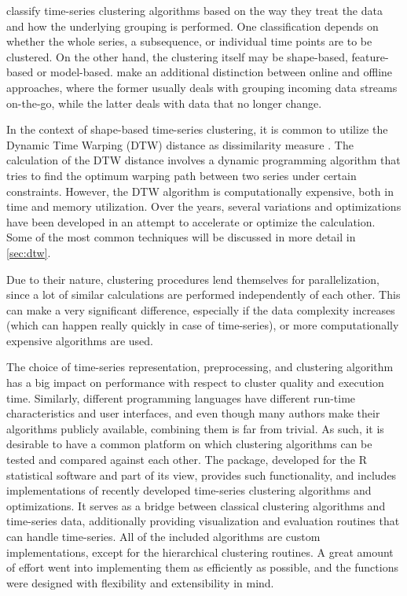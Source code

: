 \citet{aghabozorgi2015} classify time-series clustering algorithms based on the way they treat the data and how the underlying grouping is performed.
One classification depends on whether the whole series,
a subsequence,
or individual time points are to be clustered.
On the other hand,
the clustering itself may be shape-based,
feature-based
or model-based.
\citet{aggarwal2013} make an additional distinction between online and offline approaches,
where the former usually deals with grouping incoming data streams on-the-go,
while the latter deals with data that no longer change.

In the context of shape-based time-series clustering,
it is common to utilize the Dynamic Time Warping (DTW) distance as dissimilarity measure \citep{aghabozorgi2015}.
The calculation of the DTW distance involves a dynamic programming algorithm that tries to find the optimum warping path between two series under certain constraints.
However, the DTW algorithm is computationally expensive,
both in time and memory utilization.
Over the years, several variations and optimizations have been developed in an attempt to accelerate or optimize the calculation.
Some of the most common techniques will be discussed in more detail in \cref{sec:dtw}.

Due to their nature,
clustering procedures lend themselves for parallelization,
since a lot of similar calculations are performed independently of each other.
This can make a very significant difference,
especially if the data complexity increases
(which can happen really quickly in case of time-series),
or more computationally expensive algorithms are used.

The choice of time-series representation,
preprocessing,
and clustering algorithm has a big impact on performance with respect to cluster quality and execution time.
Similarly, different programming languages have different run-time characteristics and user interfaces,
and even though many authors make their algorithms publicly available,
combining them is far from trivial.
As such,
it is desirable to have a common platform on which clustering algorithms can be tested and compared against each other.
The \dtwclust{} package,
developed for the R statistical software and part of its  view,
provides such functionality,
and includes implementations of recently developed time-series clustering algorithms and optimizations.
It serves as a bridge between classical clustering algorithms and time-series data,
additionally providing visualization and evaluation routines that can handle time-series.
All of the included algorithms are custom implementations,
except for the hierarchical clustering routines.
A great amount of effort went into implementing them as efficiently as possible,
and the functions were designed with flexibility and extensibility in mind.

